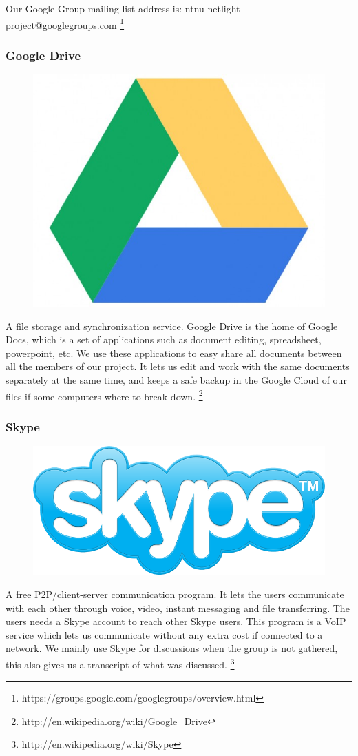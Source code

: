 Our Google Group mailing list address is: ntnu-netlight-project@googlegroups.com
\footnote{https://groups.google.com/googlegroups/overview.html}

\subsubsection{Google Drive}

\begin{figure}
\vspace{-30pt}
\centering
\includegraphics[width = .20\textwidth]{image/drive-logo.jpg}
\end{figure}

A file storage and synchronization service. Google Drive is the home of Google Docs, which is a set of applications such as document editing, spreadsheet, powerpoint, etc. We use these applications to easy share all documents between all the members of our project. It lets us edit and work with the same documents separately at the same time, and keeps a safe backup in the Google Cloud of our files if some computers where to break down.
\footnote{http://en.wikipedia.org/wiki/Google\_Drive}


\subsubsection{Skype}

\begin{figure}
\vspace{-30pt}
\centering
\includegraphics[width = .20\textwidth]{image/skype-logo.png}
\end{figure}

A free P2P/client-server communication program. It lets the users communicate with each other through voice, video, instant messaging and file transferring. The users needs a Skype account to reach other Skype users. This program is a VoIP service which lets us communicate without any extra cost if connected to a network. We mainly use Skype for discussions when the group is not gathered, this also gives us a transcript of what was discussed.
\footnote{http://en.wikipedia.org/wiki/Skype}

